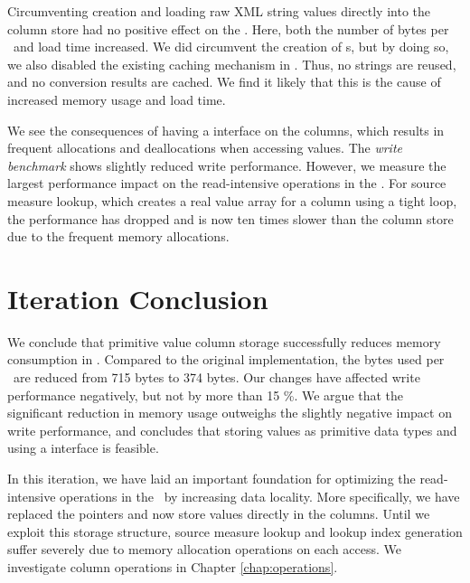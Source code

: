 Circumventing  creation and loading raw XML string values directly into the column store had no positive effect on the \tpchdl. Here, both the number of bytes per \lineitem~and load time increased. We did circumvent the creation of s, but by doing so, we also disabled the existing caching mechanism in \gap. Thus, no strings are reused, and no conversion results are cached. We find it likely that this is the cause of increased memory usage and load time.

We see the consequences of having a  interface on the columns, which results in frequent allocations and deallocations when accessing values. The \textit{write benchmark} shows slightly reduced write performance. However, we measure the largest performance impact on the read-intensive operations in the \tpchdl. For source measure lookup, which creates a real value array for a column using a tight loop, the performance has dropped and is now ten times slower than the  column store due to the frequent memory allocations.


\section{Iteration Conclusion}
\label{sec:Iteration Conclusion}
We conclude that primitive value column storage successfully reduces memory consumption in \gap. Compared to the original implementation, the bytes used per \lineitem~are reduced from 715 bytes to 374 bytes. Our changes have affected write performance negatively, but not by more than 15 \%. We argue that the significant reduction in memory usage outweighs the slightly negative impact on write performance, and concludes that storing values as primitive data types and using a  interface is feasible. 

In this iteration, we have laid an important foundation for optimizing the read-intensive operations in the \tpchdl~by increasing data locality. More specifically, we have replaced the  pointers and now store values directly in the columns. Until we exploit this storage structure, source measure lookup and lookup index generation suffer severely due to memory allocation operations on each access. We investigate column operations in Chapter \ref{chap:operations}.


